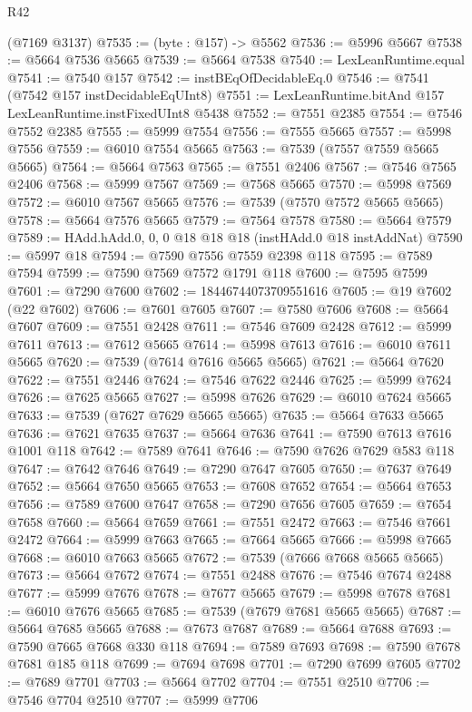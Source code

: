 \begin{lexlean}{R42}
\begin{coremodule}
    (@7169 @3137)
@7535 := (byte : @157) -> @5562
@7536 := @5996 @5667
@7538 := @5664 @7536 @5665
@7539 := @5664 @7538
@7540 := LexLeanRuntime.equal
@7541 := @7540 @157
@7542 := instBEqOfDecidableEq.{0}
@7546 := @7541 (@7542 @157 instDecidableEqUInt8)
@7551 := LexLeanRuntime.bitAnd @157 LexLeanRuntime.instFixedUInt8 @5438
@7552 := @7551 @2385
@7554 := @7546 @7552 @2385
@7555 := @5999 @7554
@7556 := @7555 @5665
@7557 := @5998 @7556
@7559 := @6010 @7554 @5665
@7563 := @7539 (@7557 @7559 @5665 @5665)
@7564 := @5664 @7563
@7565 := @7551 @2406
@7567 := @7546 @7565 @2406
@7568 := @5999 @7567
@7569 := @7568 @5665
@7570 := @5998 @7569
@7572 := @6010 @7567 @5665
@7576 := @7539 (@7570 @7572 @5665 @5665)
@7578 := @5664 @7576 @5665
@7579 := @7564 @7578
@7580 := @5664 @7579
@7589 := HAdd.hAdd.{0, 0, 0} @18 @18 @18 (instHAdd.{0} @18 instAddNat)
@7590 := @5997 @18
@7594 := @7590 @7556 @7559 @2398 @118
@7595 := @7589 @7594
@7599 := @7590 @7569 @7572 @1791 @118
@7600 := @7595 @7599
@7601 := @7290 @7600
@7602 := 18446744073709551616
@7605 := @19 @7602 (@22 @7602)
@7606 := @7601 @7605
@7607 := @7580 @7606
@7608 := @5664 @7607
@7609 := @7551 @2428
@7611 := @7546 @7609 @2428
@7612 := @5999 @7611
@7613 := @7612 @5665
@7614 := @5998 @7613
@7616 := @6010 @7611 @5665
@7620 := @7539 (@7614 @7616 @5665 @5665)
@7621 := @5664 @7620
@7622 := @7551 @2446
@7624 := @7546 @7622 @2446
@7625 := @5999 @7624
@7626 := @7625 @5665
@7627 := @5998 @7626
@7629 := @6010 @7624 @5665
@7633 := @7539 (@7627 @7629 @5665 @5665)
@7635 := @5664 @7633 @5665
@7636 := @7621 @7635
@7637 := @5664 @7636
@7641 := @7590 @7613 @7616 @1001 @118
@7642 := @7589 @7641
@7646 := @7590 @7626 @7629 @583 @118
@7647 := @7642 @7646
@7649 := @7290 @7647 @7605
@7650 := @7637 @7649
@7652 := @5664 @7650 @5665
@7653 := @7608 @7652
@7654 := @5664 @7653
@7656 := @7589 @7600 @7647
@7658 := @7290 @7656 @7605
@7659 := @7654 @7658
@7660 := @5664 @7659
@7661 := @7551 @2472
@7663 := @7546 @7661 @2472
@7664 := @5999 @7663
@7665 := @7664 @5665
@7666 := @5998 @7665
@7668 := @6010 @7663 @5665
@7672 := @7539 (@7666 @7668 @5665 @5665)
@7673 := @5664 @7672
@7674 := @7551 @2488
@7676 := @7546 @7674 @2488
@7677 := @5999 @7676
@7678 := @7677 @5665
@7679 := @5998 @7678
@7681 := @6010 @7676 @5665
@7685 := @7539 (@7679 @7681 @5665 @5665)
@7687 := @5664 @7685 @5665
@7688 := @7673 @7687
@7689 := @5664 @7688
@7693 := @7590 @7665 @7668 @330 @118
@7694 := @7589 @7693
@7698 := @7590 @7678 @7681 @185 @118
@7699 := @7694 @7698
@7701 := @7290 @7699 @7605
@7702 := @7689 @7701
@7703 := @5664 @7702
@7704 := @7551 @2510
@7706 := @7546 @7704 @2510
@7707 := @5999 @7706

\end{coremodule}
\end{lexlean}
